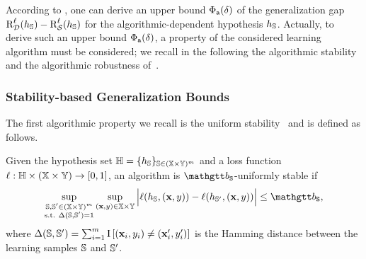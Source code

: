 According to , one can derive an upper bound $\PhiA(\delta)$ of the generalization gap $\RiskLoss_{\D}(\h_{\S})-\RiskLoss_{\dS}(\h_{\S})$ for the algorithmic-dependent hypothesis $\h_{\S}$.
Actually, to derive such an upper bound $\PhiA(\delta)$, a property of the considered learning algorithm must be considered; we recall in the following the algorithmic stability~\citep{BousquetElisseeff2002} and the algorithmic robustness of~\citet{XuMannor2010,XuMannor2012}.

\subsubsection{Stability-based Generalization Bounds}

The first algorithmic property we recall is the uniform stability~\citep{BousquetElisseeff2002} and is defined as follows.

\begin{definition}\label{chap:intro:def:stability} Given the hypothesis set $\H=\{\h_{\S}\}_{\S\in(\X\times\Y)^\m}$ and a loss function $\loss:\H\times(\X\times\Y)\to [0,1]$, an algorithm is $\stab$-uniformly stable if
\begin{align*}
    \sup_{\substack{\S,\S' \in (\X\times\Y)^\m\\\text{s.t.}\  \Delta(\S,\S')=1}}\sup_{(\x,\y)\in\X{\times}\Y} \Big\vert \loss(h_{\S}, (\x,\y))-\loss(h_{\S'}, (\x,\y)) \Big\vert \le \stab,
\end{align*}
where $\Delta(\S, \S')=\sum_{i=1}^\m\indic\LB (\x_i,\y_i) \ne (\x_i',\y_i') \RB$ is the Hamming distance between the learning samples $\S$ and $\S'$.
\end{definition}

